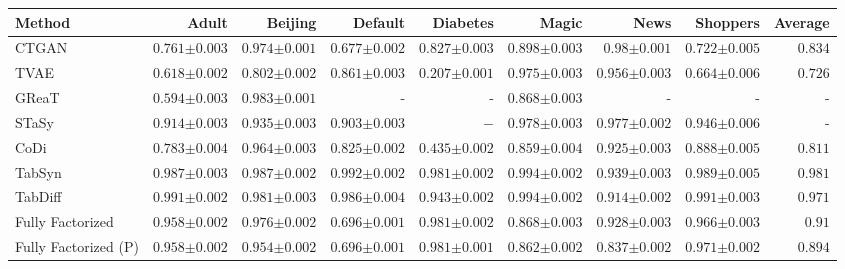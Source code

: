 \begin{tabular}{lrrrrrrr|r}
    \toprule[0.8pt]
     \textbf{Method} & \textbf{Adult} & \textbf{Beijing} & \textbf{Default} & \textbf{Diabetes} & \textbf{Magic} & \textbf{News} & \textbf{Shoppers} & \textbf{Average} \\
    \midrule 
    CTGAN & $0.761${\tiny${\pm 0.003}$} & $0.974${\tiny${\pm 0.001}$} & $0.677${\tiny${\pm 0.002}$} & $0.827${\tiny${\pm 0.003}$} & $0.898${\tiny${\pm 0.003}$} & $0.98${\tiny${\pm 0.001}$} & $0.722${\tiny${\pm 0.005}$} & $0.834$ \\
    TVAE & $0.618${\tiny${\pm 0.002}$} & $0.802${\tiny${\pm 0.002}$} & $0.861${\tiny${\pm 0.003}$} & $0.207${\tiny${\pm 0.001}$} & $0.975${\tiny${\pm 0.003}$} & $0.956${\tiny${\pm 0.003}$} & $0.664${\tiny${\pm 0.006}$} & $0.726$ \\
    GReaT & $0.594${\tiny${\pm 0.003}$} & $0.983${\tiny${\pm 0.001}$} & - & - & $0.868${\tiny${\pm 0.003}$} & - & - & - \\
    STaSy & $0.914${\tiny${\pm 0.003}$} & $0.935${\tiny${\pm 0.003}$} & $0.903${\tiny${\pm 0.003}$} & $-$ & $0.978${\tiny${\pm 0.003}$} & $0.977${\tiny${\pm 0.002}$} & $0.946${\tiny${\pm 0.006}$} & - \\
    CoDi & $0.783${\tiny${\pm 0.004}$} & $0.964${\tiny${\pm 0.003}$} & $0.825${\tiny${\pm 0.002}$} & $0.435${\tiny${\pm 0.002}$} & $0.859${\tiny${\pm 0.004}$} & $0.925${\tiny${\pm 0.003}$} & $0.888${\tiny${\pm 0.005}$} & $0.811$ \\
    TabSyn & $0.987${\tiny${\pm 0.003}$} & $0.987${\tiny${\pm 0.002}$} & $0.992${\tiny${\pm 0.002}$} & $0.981${\tiny${\pm 0.002}$} & $0.994${\tiny${\pm 0.002}$} & $0.939${\tiny${\pm 0.003}$} & $0.989${\tiny${\pm 0.005}$} & $0.981$ \\
    TabDiff & $0.991${\tiny${\pm 0.002}$} & $0.981${\tiny${\pm 0.003}$} & $0.986${\tiny${\pm 0.004}$} & $0.943${\tiny${\pm 0.002}$} & $0.994${\tiny${\pm 0.002}$} & $0.914${\tiny${\pm 0.002}$} & $0.991${\tiny${\pm 0.003}$} & $0.971$ \\
    \midrule
    Fully Factorized & $0.958${\tiny${\pm 0.002}$} & $0.976${\tiny${\pm 0.002}$} & $0.696${\tiny${\pm 0.001}$} & $0.981${\tiny${\pm 0.002}$} & $0.868${\tiny${\pm 0.003}$} & $0.928${\tiny${\pm 0.003}$} & $0.966${\tiny${\pm 0.003}$} & $0.91$ \\
    Fully Factorized (P) & $0.958${\tiny${\pm 0.002}$} & $0.954${\tiny${\pm 0.002}$} & $0.696${\tiny${\pm 0.001}$} & $0.981${\tiny${\pm 0.001}$} & $0.862${\tiny${\pm 0.002}$} & $0.837${\tiny${\pm 0.002}$} & $0.971${\tiny${\pm 0.002}$} & $0.894$ \\

\end{tabular}
